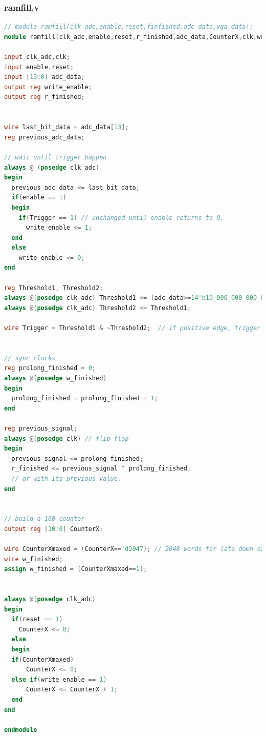 \documentclass[11pt]{scrartcl}
\begin{document}
\subsubsection{ramfill.v}
\label{sec:ramfilllv}
\begin{lstlisting}[language=Verilog]
// module ramfill(clk_adc,enable,reset,finfished,adc_data,vga_data);
module ramfill(clk_adc,enable,reset,r_finished,adc_data,CounterX,clk,write_enable);

input clk_adc,clk;
input enable,reset;
input [13:0] adc_data;
output reg write_enable;
output reg r_finished;


wire last_bit_data = adc_data[13];
reg previous_adc_data;

// wait until trigger happen
always @ (posedge clk_adc)
begin
  previous_adc_data <= last_bit_data;
  if(enable == 1)
  begin
    if(Trigger == 1) // unchanged until enable returns to 0.
      write_enable <= 1;
  end
  else
    write_enable <= 0;
end

reg Threshold1, Threshold2;
always @(posedge clk_adc) Threshold1 <= (adc_data>=14'b10_000_000_000_000);
always @(posedge clk_adc) Threshold2 <= Threshold1;

wire Trigger = Threshold1 & ~Threshold2;  // if positive edge, trigger! 


// sync clocks
reg prolong_finished = 0;
always @(posedge w_finished)
begin
  prolong_finished = prolong_finished + 1;
end

reg previous_signal;
always @(posedge clk) // flip flop
begin
  previous_signal <= prolong_finished; 
  r_finished <= previous_signal ^ prolong_finished;
  // or with its previous value.
end


// build a 160 counter
output reg [10:0] CounterX;

wire CounterXmaxed = (CounterX=='d2047); // 2048 words for late down sampling
wire w_finished;
assign w_finished = (CounterXmaxed==1);


always @(posedge clk_adc)
begin
  if(reset == 1)
    CounterX <= 0;
  else
  begin
  if(CounterXmaxed)
      CounterX <= 0;
  else if(write_enable == 1)
      CounterX <= CounterX + 1;
  end
end

endmodule

\end{lstlisting}
\end{document}
